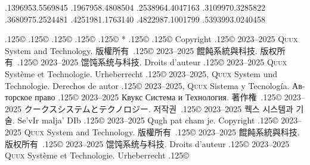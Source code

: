\documentclass{cookbook}
\begin{document}
{{{	.1396953\textwidth .5569845\textwidth%
	.1967958\textwidth .4808504\textwidth
	.2538964\textwidth .4047163\textwidth
	.3109970\textwidth .3285822\textwidth
	.3680975\textwidth .2524481\textwidth
	.4251981\textwidth .1763140\textwidth%
	.4822987\textwidth .1001799\textwidth%
	.5393993\textwidth .0240458\textwidth%
\rule{0pt}{0pt}%
{\lower.125\baselineskip\hbox{\copyright}}
{\lower.125\baselineskip\hbox{\copyright}}
{\lower.125\baselineskip\hbox{\copyright}}
{\lower.125\baselineskip\hbox{\copyright}}
{\lower.125\baselineskip\hbox{\copyright}}
\hspace{.25em plus 1em}%
*\texttt{{\gitabbrcommithash}}
{\lower.125\baselineskip\hbox{\copyright}}
{\lower.125\baselineskip\hbox{\copyright}}
Copyright {\lower.125\baselineskip\hbox{\copyright}}
	2023--2025 \textsc{Quux} System and Technology.
版權所有~{\lower.125\baselineskip\hbox{\copyright}}
	2023--2025 餛飩系統與科技.
版权所有~{\lower.125\baselineskip\hbox{\copyright}}
	2023--2025 馄饨系统与科技.
Droits d'auteur {\lower.125\baselineskip\hbox{\copyright}} %
	2023--2025 \textsc{Quux} Système et Technologie.
Urheberrecht {\lower.125\baselineskip\hbox{\copyright}} %
	2023--2025, \textsc{Quux} System und Technologie.
Derechos de autor {\lower.125\baselineskip\hbox{\copyright}} %
	2023--2025, \textsc{Quux} Sistema y Tecnología.
\foreignlanguage{russian}{Авторское право} %
	{\lower.125\baselineskip\hbox{\copyright}}
	2023–2025 \foreignlanguage{russian}{Квукс Система и Технология.}
著作権~{\lower.125\baselineskip\hbox{\copyright}}
	2023--2025 クークスシステムとテクノロジー.
저작권~{\lower.125\baselineskip\hbox{\copyright}}
	2023--2025 퀙스 시스템과 기술.
Se'vIr malja' DIb {\lower.125\baselineskip\hbox{\copyright}} %
	2023--2025 Qugh pat cham je.
\dag\texttt{{\gitabbrcommithash}}
Copyright {\lower.125\baselineskip\hbox{\copyright}}
	2023--2025 \textsc{Quux} System and Technology.
版權所有~{\lower.125\baselineskip\hbox{\copyright}}
	2023--2025 餛飩系統與科技.
版权所有~{\lower.125\baselineskip\hbox{\copyright}}
	2023--2025 馄饨系统与科技.
Droits d'auteur {\lower.125\baselineskip\hbox{\copyright}} %
	2023--2025 \textsc{Quux} Système et Technologie.
Urheberrecht {\lower.125\baselineskip\hbox{\copyright}} %
}}}
\end{document}
